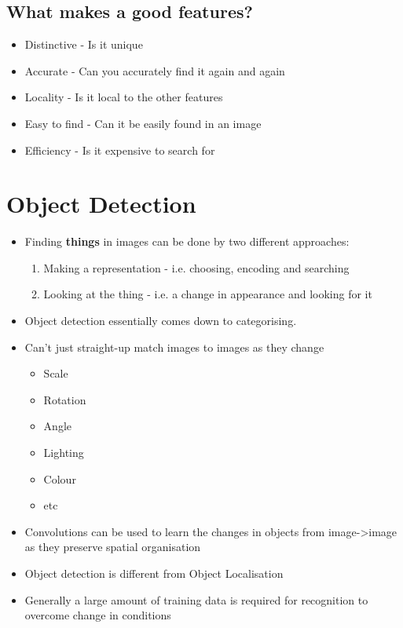 \documentclass[a4paper]{article}
\begin{document}
\subsection{What makes a good features?}
\label{sec-2-4}
\begin{itemize}
\item Distinctive - Is it unique
\item Accurate - Can you accurately find it again and again
\item Locality - Is it local to the other features
\item Easy to find - Can it be easily found in an image
\item Efficiency - Is it expensive to search for
\end{itemize}

\section{Object Detection}
\label{sec-3}
\begin{itemize}
\item Finding \textbf{things} in images can be done by two different approaches:
\begin{enumerate}
\item Making a representation - i.e. choosing, encoding and searching
\item Looking at the thing - i.e. a change in appearance and looking for it
\end{enumerate}
\item Object detection essentially comes down to categorising.
\item Can't just straight-up match images to images as they change
\begin{itemize}
\item Scale
\item Rotation
\item Angle
\item Lighting
\item Colour
\item etc
\end{itemize}
\item Convolutions can be used to learn the changes in objects from image->image as they preserve spatial organisation
\item Object detection is different from Object Localisation
\item Generally a large amount of training data is required for recognition to overcome change in conditions
\end{itemize}
\end{document}

